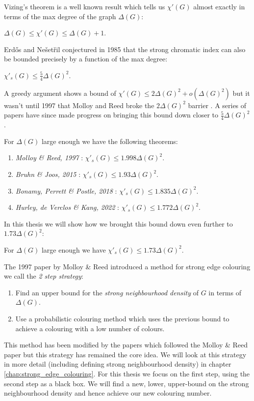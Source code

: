 Vizing's theorem is a well known result which tells us $\chi'(G)$ almost exactly in terms of
the max degree of the graph $\Delta(G)$:
\begin{knowntheorem}
    $\Delta(G) \leq \chi'(G) \leq \Delta(G) + 1$.
\end{knowntheorem}
Erd\H{o}s and Nešetřil conjectured in 1985 that
the strong chromatic index can also be bounded precisely by a function of the max degree:
\begin{knownconjecture}
    \label{conj:intro_erdos_nesetril}
    $\chi'_s(G) \leq \frac{5}{4}\Delta(G)^2$.
\end{knownconjecture}
A greedy argument shows a bound of $\chi'(G) \leq 2\Delta(G)^2 + o(\Delta(G)^2)$ but it wasn't until
1997 that Molloy and Reed broke the $2\Delta(G)^2$ barrier \cite{molloyBoundStrongChromatic1997}.
A series of papers have since made progress on bringing this bound down closer to $\frac{5}{4}\Delta(G)^2$.

For $\Delta(G)$ large enough we have the following theorems:
\begin{enumerate}
  \item \textit{Molloy \& Reed, 1997} \cite{molloyBoundStrongChromatic1997}:
        $\chi'_s(G) \leq 1.998\Delta(G)^2$.
  \item \textit{Bruhn \& Joos, 2015} \cite{bruhnStrongerBoundStrong2018}:
        $\chi'_s(G) \leq 1.93\Delta(G)^2$.
  \item \textit{Bonamy, Perrett \& Postle, 2018} \cite{bonamyColouringGraphsSparse2018}:
        $\chi'_s(G) \leq 1.835\Delta(G)^2$.
  \item \textit{Hurley, de Verclos \& Kang, 2022} \cite{hurleyImprovedProcedureColouring2022}:
        $\chi'_s(G) \leq 1.772\Delta(G)^2$.
\end{enumerate}

In this thesis we will show how we brought this bound down even further to $1.73\Delta(G)^2$:
\begin{knowntheorem}
    For $\Delta(G)$ large enough we have
    $\chi'_s(G) \leq 1.73\Delta(G)^2$.
\end{knowntheorem}

The 1997 paper by Molloy \& Reed introduced a method for strong edge colouring we call the
\textit{2 step strategy}:
\begin{enumerate}
    \item Find an upper bound for the \textit{strong neighbourhood density} of $G$ in terms of
        $\Delta(G)$.
    \item Use a probabilistic colouring method which uses the previous bound to achieve a colouring
        with a low number of colours.
\end{enumerate}
This method has been modified by the papers which followed the Molloy \& Reed paper but this
strategy has remained the core idea. We will look at this strategy in more detail (including
defining strong neighbourhood density) in chapter \ref{chap:strong_edge_colouring}.
For this thesis we focus on the first step, using the second step as a black box. We will
find a new, lower, upper-bound on the strong neighbourhood density and hence achieve our
new colouring number.

